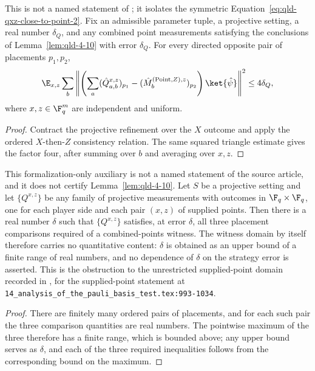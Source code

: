 \begin{lemma}
	\label{lem:qld-combined-point-z-marginal-distance}
	\leanok
	This is not a named statement of \cite{Ji2020MIPStar}; it isolates the
	symmetric Equation~\eqref{eq:qld-qxz-close-to-point-2}. Fix an admissible
	parameter tuple, a projective setting, a real number $\delta_Q$, and any
	combined point measurements satisfying the conclusions of
	Lemma~\ref{lem:qld-4-10} with error $\delta_Q$. For every directed opposite
	pair of placements $p_1,p_2$,
	\[
		\E_{x,z}\sum_b \left\|
		\left(\sum_a (\hat Q^{x,z}_{a,b})_{p_1}
			- (\hat M^{(\mathrm{Point},Z),z}_b)_{p_2}\right)
		\ket{\hat\psi}\right\|^2 \leq 4\delta_Q,
		\label{eq:qld-qxz-close-to-point-2}
	\]
	where $x,z\in\F_q^m$ are independent and uniform.
\end{lemma}
\begin{proof}
	\leanok
	Contract the projective refinement over the $X$ outcome and apply the ordered
	$X$-then-$Z$ consistency relation. The same squared triangle estimate gives
	the factor four, after summing over $b$ and averaging over $x,z$.
\end{proof}

\begin{lemma}
	\label{lem:combined-points-unrestricted-error}
	\leanok
	This formalization-only auxiliary is not a named statement of the source
	article, and it does not certify Lemma~\ref{lem:qld-4-10}. Let $S$ be a
	projective setting and let $\{Q^{x,z}\}$ be any family of projective
	measurements with outcomes in $\F_q \times \F_q$, one for each player side
	and each pair $(x,z)$ of supplied points. Then there is a real number
	$\delta$ such that $\{Q^{x,z}\}$ satisfies, at error $\delta$, all three
	placement comparisons required of a combined-points witness. The witness
	domain by itself therefore carries no quantitative content: $\delta$ is
	obtained as an upper bound of a finite range of real numbers, and no
	dependence of $\delta$ on the strategy error is asserted. This is the
	obstruction to the unrestricted supplied-point domain recorded in
	\cite{gap:qpbt_combined-lines-error-term}, for the supplied-point statement
	at \texttt{14\_analysis\_of\_the\_pauli\_basis\_test.tex:993-1034}.
\end{lemma}
\begin{proof}
	\leanok
	There are finitely many ordered pairs of placements, and for each such pair
	the three comparison quantities are real numbers. The pointwise maximum of
	the three therefore has a finite range, which is bounded above; any upper
	bound serves as $\delta$, and each of the three required inequalities
	follows from the corresponding bound on the maximum.
\end{proof}

